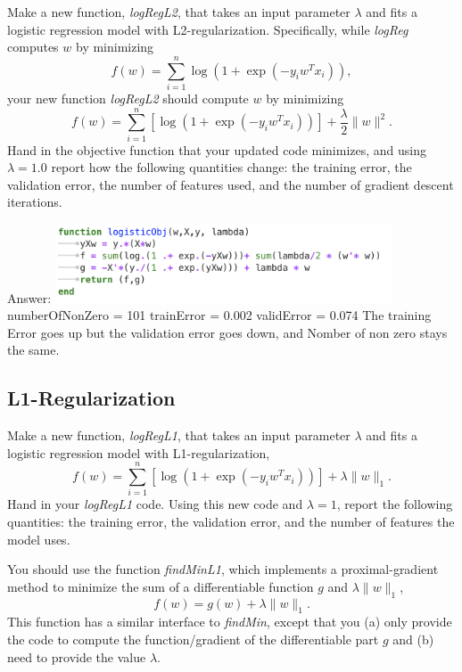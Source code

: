 \documentclass{article}
\def\ans#1{\par\gre{Answer: #1}}
\def\blu#1{{\color{blu}#1}}
\def\gre#1{{\color{gre}#1}}
\def\norm#1{\|#1\|}
\begin{document}
Make a new function, \emph{logRegL2}, that takes an input parameter $\lambda$ and fits a logistic regression model with L2-regularization. Specifically, while \emph{logReg} computes $w$ by minimizing
\[
f(w) = \sum_{i=1}^n \log(1+\exp(-y_iw^Tx_i)),
\]
your new function \emph{logRegL2} should compute $w$ by minimizing
\[
f(w) = \sum_{i=1}^n \left[\log(1+\exp(-y_iw^Tx_i))\right] + \frac{\lambda}{2}\norm{w}^2.
\]
\blu{Hand in the objective function that your updated code minimizes, and using $\lambda=1.0$ report how the following quantities change: the training error, the validation error, the number of features used, and the number of gradient descent iterations.}
\ans{
    \includegraphics[width = 10cm]{Q22.png}
    numberOfNonZero = 101
trainError = 0.002
validError = 0.074
The training Error goes up but the validation error goes down, and Nomber of non zero stays the same.
}



\subsection{L1-Regularization}

Make a new function, \emph{logRegL1}, that takes an input parameter $\lambda$ and fits a logistic regression model with L1-regularization,
\[
f(w) = \sum_{i=1}^n \left[\log(1+\exp(-y_iw^Tx_i))\right] + \lambda\norm{w}_1.
\]
\blu{Hand in your \emph{logRegL1} code. Using this new code and $\lambda=1$, report the following quantities: the training error, the validation error, and the number of features the model uses.}


You should use the function \emph{findMinL1}, which implements a proximal-gradient method to minimize the sum of a differentiable function $g$ and $\lambda\norm{w}_1$,
\[
f(w) = g(w) + \lambda \norm{w}_1.
\]
 This function has a similar interface to \emph{findMin}, except that you (a) only provide the code to compute the function/gradient of the differentiable part $g$ and (b) need to provide the value $\lambda$. 
\end{document}
